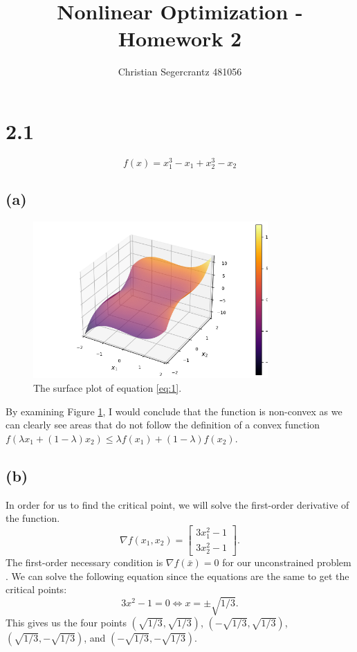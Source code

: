 \documentclass{article}
\title{Nonlinear Optimization - Homework 2 }
\author{Christian Segercrantz 481056}
\begin{document}
	\maketitle
	\pagebreak
\section*{2.1}
\begin{equation} \label{eq:1}
	f(x) = x_1^3-x_1+x_2^3-x_2
\end{equation}
\subsection*{(a)}
	\begin{figure}[H]
		\includegraphics[width=0.8\textwidth]{H21_surface.png}
		\caption{The surface plot of equation \eqref{eq:1}.}
		\label{fig:1a}
	\end{figure}
	By examining Figure \ref{fig:1a}, I would conclude that the function is non-convex as we can clearly see areas that do not follow the definition of a convex function $f(\lambda x_1 + (1 - \lambda)x_2 ) \leq \lambda f(x_1 ) + (1 - \lambda)f(x_2)$.
\subsection*{(b)}
	In order for us to find the critical point, we will solve the first-order derivative of the function.
	\begin{equation}
		\nabla f(x_1,x_2) =
		\begin{bmatrix}
			3x_1^2-1 \\
			3x_2^2-1
		\end{bmatrix}.
	\end{equation}
	The first-order necessary condition is $\nabla f(\bar{x}) = 0$ for our unconstrained problem . We can solve the following equation since the equations are the same to get the critical points:
	\begin{equation}
		3x^2-1 = 0 \iff x= \pm\sqrt{1/3}.
	\end{equation}
	This gives us the four points $(\sqrt{1/3},\sqrt{1/3})$, $(-\sqrt{1/3},\sqrt{1/3})$, $(\sqrt{1/3},-\sqrt{1/3})$, and $(-\sqrt{1/3},-\sqrt{1/3})$.
\end{document}
